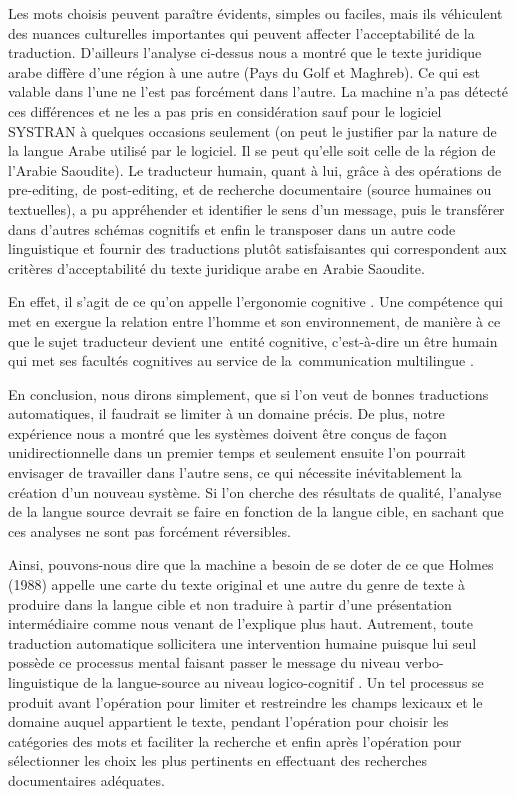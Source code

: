 \documentclass[french]{textolivre}
\begin{document}
Les mots choisis peuvent paraître évidents, simples ou faciles, mais ils véhiculent des nuances culturelles importantes qui peuvent affecter l’acceptabilité de la traduction. D’ailleurs l’analyse ci-dessus nous a montré que le texte juridique arabe diffère d’une région à une autre (Pays du Golf et Maghreb). Ce qui est valable dans l’une ne l’est pas forcément dans l’autre. La machine n’a pas détecté ces différences et ne les a pas pris en considération sauf pour le logiciel SYSTRAN à quelques occasions seulement (on peut le justifier par la nature de la langue Arabe utilisé par le logiciel. Il se peut qu’elle soit celle de la région de l’Arabie Saoudite).  Le traducteur humain, quant à lui, grâce à des opérations de pre-editing, de post-editing, et de recherche documentaire (source humaines ou textuelles), a pu appréhender et identifier le sens d’un message, puis le transférer dans d’autres schémas cognitifs et enfin le transposer dans un autre code linguistique \cite[p. 63]{rollo2016} et fournir des traductions plutôt satisfaisantes qui correspondent aux critères d’acceptabilité du texte juridique arabe en Arabie Saoudite.

En effet, il s’agit de ce qu’on appelle l’ergonomie cognitive \cite[p. 2]{lavault-olleon2012}. Une compétence qui met en exergue la relation entre l’homme et son environnement, de manière à ce que le sujet traducteur devient une entité cognitive, c’est-à-dire un être humain qui met ses facultés cognitives au service de la communication multilingue \cite{politis2017}.

En conclusion, nous dirons simplement, que si l’on veut de bonnes traductions automatiques, il faudrait se limiter à un domaine précis. De plus, notre expérience nous a montré que les systèmes doivent être conçus de façon unidirectionnelle dans un premier temps et seulement ensuite l’on pourrait envisager de travailler dans l’autre sens, ce qui nécessite inévitablement la création d’un nouveau système. Si l’on cherche des résultats de qualité, l’analyse de la langue source devrait se faire en fonction de la langue cible, en sachant que ces analyses ne sont pas forcément réversibles. 

Ainsi, pouvons-nous dire que la machine a besoin de se doter de ce que Holmes (1988) appelle une carte du texte original et une autre du genre de texte à produire dans la langue cible \cite[p. 2]{farnoud2014} et non traduire à partir d’une présentation intermédiaire comme nous venant de l’explique plus haut. Autrement, toute traduction automatique sollicitera une intervention humaine puisque lui seul possède ce processus mental faisant passer le message du niveau verbo-linguistique de la langue-source au niveau logico-cognitif \cite[p. 2]{farnoud2014}. Un tel processus se produit avant l’opération pour limiter et restreindre les champs lexicaux et le domaine auquel appartient le texte, pendant l’opération pour choisir les catégories des mots et faciliter la recherche et enfin après l’opération pour sélectionner les choix les plus pertinents en effectuant des recherches documentaires adéquates.
\end{document}
